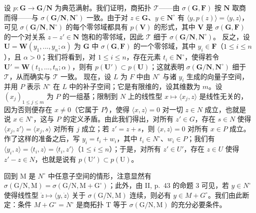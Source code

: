 \begin{enumerate}
  设 \(p: \mathbf{G} \to \mathbf{G} / \mathbf{N}\) 为典范满射。我们证明，商拓扑 \(\mathcal{T}\)——由 \(\sigma(\mathbf{G}, \mathbf{F})\) 按 \(\mathbf{N}\) 取商而得——与 \(\sigma(\mathbf{G} / \mathbf{N}, \mathbf{N}^{\circ})\) 一致。由于对 \(z \in \mathbf{G}\)、\(y \in \mathbf{N}^{\circ}\) 有 \(\langle y, p(z) \rangle = \langle y, z \rangle\)，可见 \(\sigma(\mathbf{G} / \mathbf{N}, \mathbf{N}^{\circ})\) 的每个零邻域都具有 \(p(\mathbf{V})\) 的形式，其中 \(\mathbf{V}\) 是 \(\sigma(\mathbf{G}, \mathbf{F})\) 的一个对关系 \(z - z' \in \mathbf{N}\) 饱和的零邻域，因此 \(\mathcal{T}\) 细于 \(\sigma(\mathbf{G} / \mathbf{N}, \mathbf{N}^{\circ})\)。 反之，设 \(\mathbf{U} = \mathbf{W}(y_1, ..., y_n; \alpha)\) 为 \(\mathbf{G}\) 中 \(\sigma(\mathbf{G}, \mathbf{F})\) 的一个零邻域，其中 \(y_i \in \mathbf{F}\)（\(1 \leqslant i \leqslant n\)），且 \(\alpha > 0\)；我们将看到，对 \(1 \leqslant i \leqslant n\)，存在元素 \(t_i \in \mathbf{N}^{\circ}\)，使得若令 \(\mathbf{U}' = \mathbf{W}(t_1, ..., t_n; \alpha)\)，则有 \(p(\mathbf{U}') \subset p(\mathbf{U})\)；这就表明 \(\sigma(\mathbf{G} / \mathbf{N}, \mathbf{N}^{\circ})\) 细于 \(\mathcal{T}\)，从而确实与 \(\mathcal{T}\) 一致。 现在，设 \(L\) 为 \(F\) 中由 \(N^{\circ}\) 与诸 \(y_i\) 生成的向量子空间，并用 \(P\) 表示 \(N^{\circ}\) 在 \(L\) 中的补子空间；它是有限维的，设其维数为 \(m\)。设 \((x_j)_{1 \leqslant j \leqslant m}\) 为 \(P\) 的一组基；限制到 \(N\) 上的线性型 \(x \mapsto \langle x_j, z \rangle\) 是线性无关的，因为否则便存在 \(x \neq 0\)（它属于 \(P\)），使得 \(\langle x, z \rangle = 0\) 对一切 \(z \in N\) 成立，也就是说 \(x \in N^{\circ}\)，这与 \(P\) 的定义矛盾。由此我们得出，对所有 \(z' \in G\)，存在 \(s \in N\) 使得 \(\langle x_j, z' \rangle = \langle x_j, s \rangle\) 对所有 \(j\) 成立；若 \(z' = z + s\)，则 \(\langle x, z \rangle = 0\) 对所有 \(x \in P\) 成立。作了这样的准备之后，写 \(y_i = t_i + w_i\)，其中 \(t_i \in N^{\circ}\)、\(w_i \in P\)；我们有 \(\langle y_i, z \rangle = \langle t_i, z \rangle = \langle t_i, z' \rangle\)（\(1 \leqslant i \leqslant n\)）；于是，对所有 \(z' \in U'\)，存在 \(z \in U\) 使得 \(z' - z \in N\)，也就是说有 \(p(\mathrm{U}') \subset p(\mathrm{U})\)。
\end{enumerate}

回到 M 是 \(N^{\circ}\) 中任意子空间的情形，注意显然有 \(\sigma(\mathrm{G}/\mathrm{N},\mathrm{M})=\sigma(\mathrm{G}/\mathrm{N},\mathrm{M}+\mathrm{G}^{\circ})\)；此外，由 II, p.~43 的命题 3 可见，若 \(y\in N^{\circ}\) 使得线性型 \(\dot{z}\mapsto\langle y,\dot{z}\rangle\) 关于 \(\sigma(\mathrm{G}/\mathrm{N},\mathrm{M})\) 连续，则必有 \(y\in M+G^{\circ}\)。我们由此断定：条件 \(M+G^{\circ}=N^{\circ}\) 是商拓扑 T 等于 \(\sigma(\mathrm{G}/\mathrm{N},\mathrm{M})\) 的充分必要条件。

